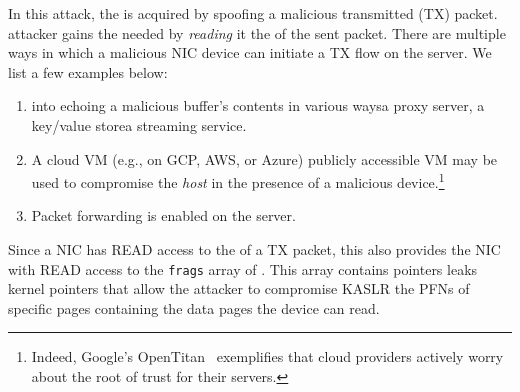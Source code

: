 In this \DIFaddbegin {}\DIFaddend attack, the \kva is acquired by spoofing a malicious transmitted (TX) packet. \DIFdelbegin {}\DIFdelend \DIFaddbegin {}\DIFaddend attacker gains the needed \kva by \emph{reading} it \DIFdelbegin {}\DIFdelend \DIFaddbegin {}\DIFaddend the \shinfo of the sent packet. 
%
There are multiple ways in which a malicious NIC device can initiate a TX flow on the server. We list a few examples below:
\begin{enumerate}
    \item \DIFdelbegin {}\DIFdelend \DIFaddbegin {}\DIFaddend into echoing a malicious buffer's contents \DIFdelbegin {}\DIFdelend in various ways\DIFdelbegin {}\DIFdelend \DIFaddbegin {}\DIFaddend a proxy server, a key/value store\DIFdelbegin {}\DIFdelend \DIFaddbegin {}\DIFaddend a streaming service.
    \item A cloud VM (e.g., on GCP, AWS, or Azure) \DIFdelbegin {}\DIFdelend \DIFaddbegin {}\DIFaddend publicly accessible VM may be used to compromise the \emph{host} in the presence of a malicious device.\footnote{Indeed, Google's OpenTitan~\cite{opentitan} exemplifies that cloud providers actively worry about the root of trust for their servers.}
    \item Packet forwarding is enabled on the server.
\end{enumerate}
Since a NIC has READ access to the \shinfo{} of a TX packet, this also provides the NIC with READ access to the \texttt{frags} \DIFdelbegin {}\DIFdelend array of \shinfo{}\DIFaddbegin {}\DIFaddend . This array contains \page{} pointers \DIFdelbegin {}\DIFdelend \DIFaddbegin {}\DIFaddend leaks kernel pointers that allow the attacker to compromise KASLR \DIFdelbegin {}\DIFdelend \DIFaddbegin {}\DIFaddend the PFNs of specific pages containing the data \DIFdelbegin \DIFdel{; }\DIFdelend \DIFaddbegin {}\DIFaddend pages the device can read\DIFaddbegin \DIFadd{)}\DIFaddend .

